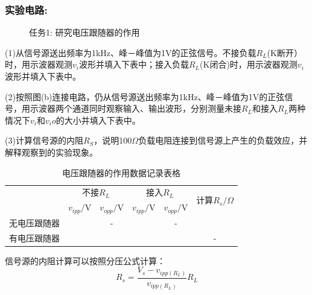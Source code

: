 \documentclass[a4paper,11pt,UTF8]{article}
\begin{document}
\subsubsection{实验电路:}
\begin{figure}[H]
	\centering
	\setcounter{subfigure}{0}
	\caption*{任务1: 研究电压跟随器的作用}
\end{figure}
(1)从信号源送出频率为1kHz、峰－峰值为1V的正弦信号。不接负载$R_L$(K断开）时，用示波器观测$v_i$波形并填入下表中；接入负载$R_L$(K闭合)时，用示波器观测$v_i$波形并填入下表中。

(2)按照图(b)连接电路，仍从信号源送出频率为1kHz、峰－峰值为1V的正弦信号，用示波器两个通道同时观察输入、输出波形，分别测量未接$R_L$和接入$R_L$两种情况下$v_i$和$v_io$的大小并填入下表中。

(3)计算信号源的内阻$R_S$，说明100$\Omega$负载电阻连接到信号源上产生的负载效应，并解释观察到的实验现象。
\begin{table}[h]
	\centering
	\caption*{电压跟随器的作用数据记录表格}
	
	\begin{tabular}{|c|c|c|c|c|c|}
		\hline
		\multirow{2}{*}{}   & \multicolumn{2}{c|}{不接$R_L$} & \multicolumn{2}{c|}{接入$R_L$} &
		\multirow{2}{*}{计算$R_s/\Omega$}\\
		\cline{2-5}
		\multirow{2}{*}{} & $v_{ipp}/$V & $v_{opp}/$V & $v_{ipp}/$V & $v_{opp}/$V & \multirow{2}{*}{}\\
		\hline
		无电压跟随器 &  & - &  & - & \\
		\hline
		有电压跟随器 &  &  &  &  & - \\
		\hline
	\end{tabular}
	\label{table_MAP}
\end{table}
信号源的内阻计算可以按照分压公式计算：
$$
	R_s=\frac{V_s-v_{ipp(R_L)}}{v_{ipp(R_L)}}R_L
$$
\end{document}
